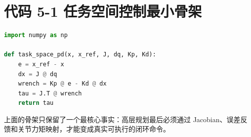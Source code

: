 \section*{代码 5-1 任务空间控制最小骨架}

\begin{lstlisting}[language=python]
import numpy as np

def task_space_pd(x, x_ref, J, dq, Kp, Kd):
    e = x_ref - x
    dx = J @ dq
    wrench = Kp @ e - Kd @ dx
    tau = J.T @ wrench
    return tau
\end{lstlisting}

上面的骨架只保留了一个最核心事实：高层规划最后必须通过 Jacobian、误差反馈和关节力矩映射，才能变成真实可执行的闭环命令。
